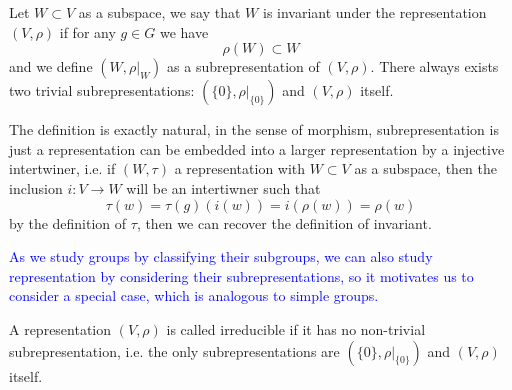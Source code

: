 \begin{definition}
    Let \(W \subset V\) as a subspace, we say that \(W\) is invariant under the representation \((V,\rho)\) if for any \(g \in G\) we have
    \[\rho(W) \subset W\]
    and we define \((W, \rho|_{W})\) as a subrepresentation of \((V,\rho)\). There always exists two trivial subrepresentations: \((\{0\},\rho|_{\{0\}})\) and \((V,\rho)\) itself.
\end{definition}

\begin{remark}
    The definition is exactly natural, in the sense of morphism, subrepresentation is just a representation can be embedded into a larger representation by a injective intertwiner, i.e. if \((W,\tau)\) a representation with \(W \subset V\) as a subspace, then the inclusion \(i: V \to W\) will be an intertiwner such that
    \[\tau(w) = \tau(g)(i(w)) = i(\rho(w)) = \rho(w)\]
    by the definition of \(\tau\), then we can recover the definition of invariant.
\end{remark}

\textcolor{blue}{As we study groups by classifying their subgroups, we can also study representation by considering their subrepresentations, so it motivates us to consider a special case, which is analogous to simple groups.
}

\begin{definition}
    A representation \((V,\rho)\) is called irreducible if it has no non-trivial subrepresentation, i.e. the only subrepresentations are \((\{0\},\rho|_{\{0\}})\) and \((V,\rho)\) itself.
\end{definition}